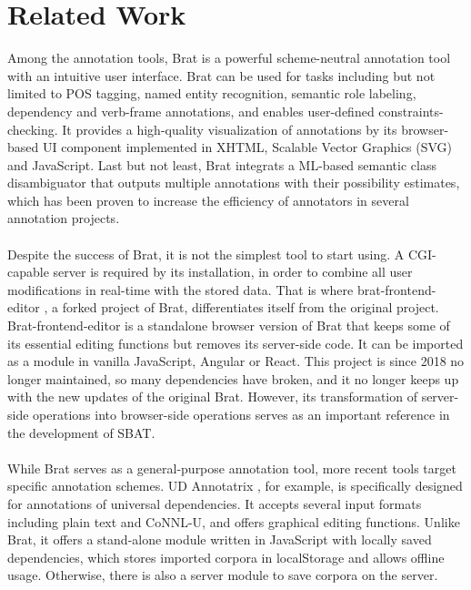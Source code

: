 \documentclass[12ptm a4paper]{article}
\begin{document}
\section{Related Work}
Among the annotation tools, Brat \cite{stenetorp-etal-2012-brat} is a powerful scheme-neutral annotation tool with an intuitive user interface. Brat can be used for tasks including but not limited to POS tagging, named entity recognition, semantic role labeling, dependency and verb-frame annotations, and enables user-defined constraints-checking. It provides a high-quality visualization of annotations by its browser-based UI component implemented in XHTML, Scalable Vector Graphics (SVG) and JavaScript. Last but not least, Brat integrats a ML-based semantic class disambiguator that outputs multiple annotations with their possibility estimates, which has been proven to increase the efficiency of annotators in several annotation projects.\\
\\
Despite the success of Brat, it is not the simplest tool to start using. A CGI-capable server is required by its installation, in order to combine all user modifications in real-time with the stored data. That is where brat-frontend-editor \cite{brat-frontend-editor}, a forked project of Brat, differentiates itself from the original project. Brat-frontend-editor is a standalone browser version of Brat that keeps some of its essential editing functions but removes its server-side code. It can be imported as a module in vanilla JavaScript, Angular or React. This project is since 2018 no longer maintained, so many dependencies have broken, and it no longer keeps up with the new updates of the original Brat. However, its transformation of server-side operations into browser-side operations serves as an important reference in the development of SBAT.\\
\\
While Brat serves as a general-purpose annotation tool, more recent tools target specific annotation schemes. UD Annotatrix \cite{tyers-etal-2017-ud}, for example, is specifically designed for annotations of universal dependencies. It accepts several input formats including plain text and CoNNL-U, and offers graphical editing functions. Unlike Brat, it offers a stand-alone module written in JavaScript with locally saved dependencies, which stores imported corpora in localStorage and allows offline usage. Otherwise, there is also a server module to save corpora on the server.\\
\\
\end{document}
